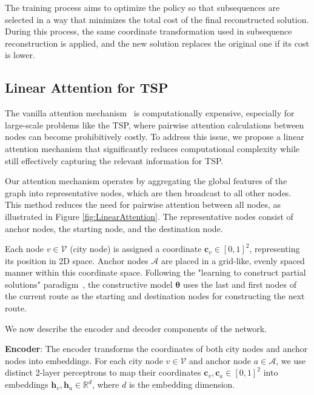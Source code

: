 The training process aims to optimize the policy so that subsequences are selected in a way that minimizes the total cost of the final reconstructed solution. During this process, the same coordinate transformation used in subsequence reconstruction is applied, and the new solution replaces the original one if its cost is lower.

\subsection{Linear Attention for TSP}
The vanilla attention mechanism~\cite{vaswani2017attention} is computationally expensive, especially for large-scale problems like the TSP, where pairwise attention calculations between nodes can become prohibitively costly. 
To address this issue, we propose a linear attention mechanism that significantly reduces computational complexity while still effectively capturing the relevant information for TSP. 

Our attention mechanism operates by aggregating the global features of the graph into representative nodes,  which are then broadcast to all other nodes.  This method reduces the need for pairwise attention between all nodes, as illustrated in Figure \ref{fig:LinearAttention}. 
The representative nodes consist of anchor nodes, the starting node, and the destination node. 

Each node $v \in \mathcal{V}$ (city node) is assigned a coordinate $\mathbf{c}_v \in [0,1]^2$, representing its position in 2D space. 
Anchor nodes $\mathcal{A}$ are placed in a grid-like, evenly spaced manner within this coordinate space. 
 Following the "learning to construct partial solutions" paradigm~\cite{luo2023neural}, the constructive model $\boldsymbol{\theta}$ uses the last and first nodes of the current route as the starting and destination nodes for constructing the next route. 
 
We now describe the encoder and decoder components of the network.

\textbf{Encoder}: The encoder transforms the coordinates of both city nodes and anchor nodes into embeddings. 
For each city node $v \in \mathcal{V}$ and anchor node $a \in \mathcal{A}$, we use distinct 2-layer perceptrons to map their coordinates ${\mathbf{c}}_{v},{\mathbf{c}}_{a} \in [0,1]^{2}$ into embeddings $\mathbf{h}_{v},\mathbf{h}_{a} \in \mathbb{R}^d$, where 
$d$ is the embedding dimension. 

